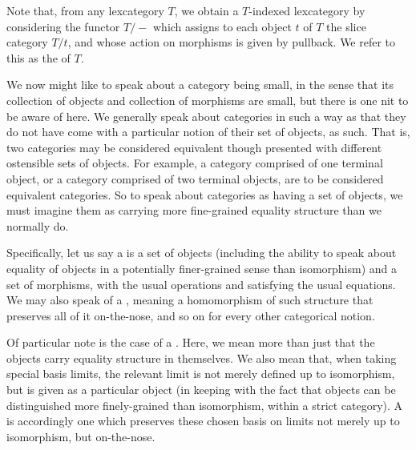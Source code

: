 Note that, from any lexcategory $T$, we obtain a $T$-indexed lexcategory by considering the functor $T/-$ which assigns to each object $t$ of $T$ the slice category $T/t$, and whose action on morphisms is given by pullback. We refer to this as the  of $T$.

We now might like to speak about a category being small, in the sense that its collection of objects and collection of morphisms are small, but there is one nit to be aware of here. We generally speak about categories in such a way as that they do not have come with a particular notion of their set of objects, as such. That is, two categories may be considered equivalent though presented with different ostensible sets of objects. For example, a category comprised of one terminal object, or a category comprised of two terminal objects, are to be considered equivalent categories. So to speak about categories as having a set of objects, we must imagine them as carrying more fine-grained equality structure than we normally do.

Specifically, let us say a  is a set of objects (including the ability to speak about equality of objects in a potentially finer-grained sense than isomorphism) and a set of morphisms, with the usual operations and satisfying the usual equations.  We may also speak of a , meaning a homomorphism of such structure that preserves all of it on-the-nose, and so on for every other categorical notion.

Of particular note is the case of a . Here, we mean more than just that the objects carry equality structure in themselves. We also mean that, when taking special basis limits, the relevant limit is not merely defined up to isomorphism, but is given as a particular object (in keeping with the fact that objects can be distinguished more finely-grained than isomorphism, within a strict category). A  is accordingly one which preserves these chosen basis on limits not merely up to isomorphism, but on-the-nose. 

